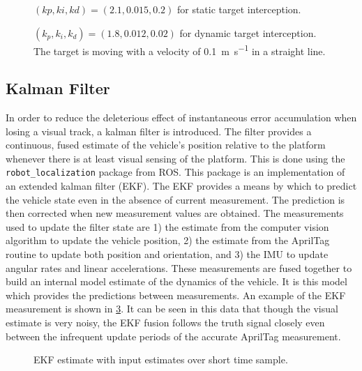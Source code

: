 \begin{figure}
    \centering
    
    \caption{$(kp,ki,kd)=(2.1,0.015,0.2)$ for static target interception.}\label{f:pid_stat}
\end{figure}

\begin{figure}
    \centering
    
    \caption{$(k_p,k_i,k_d)=(1.8,0.012,0.02)$ for dynamic target interception. The target is moving with a
    velocity of \SI{0.1}{\meter\per\s} in a straight line.}\label{f:pid_dyn}
\end{figure}


\subsection{Kalman Filter}\label{s:ekf}
In order to reduce the deleterious effect of instantaneous error accumulation when losing a visual track, a
kalman filter is introduced.  The filter provides a continuous, fused estimate of the vehicle's position
relative to the platform whenever there is at least visual sensing of the platform. This is done using the
\verb|robot_localization| package from ROS\cite{MooreStouchKeneralizedEkf2014}. This package is an
implementation of an extended kalman filter (EKF). The EKF provides a means by which to predict the vehicle
state even in the absence of current measurement\cite{kalman1960new}. The prediction is then corrected when
new measurement values are obtained. The measurements used to update the filter state are 1) the estimate from
the computer vision algorithm to update the vehicle position, 2) the estimate from the
AprilTag\cite{olson2011tags} routine to update both position and orientation, and 3) the IMU to
update angular rates and linear accelerations. These measurements are fused together to build an internal
model estimate of the dynamics of the vehicle. It is this model which provides the predictions between
measurements. An example of the EKF measurement is shown in \cref{f:ekf_plot}. It can be seen in this data
that though the visual estimate is very noisy, the EKF fusion follows the truth signal closely even between
the infrequent update periods of the accurate AprilTag measurement.

\begin{figure}[ht]
    \centering
    
    \caption{EKF estimate with input estimates over short time sample.}\label{f:ekf_plot}
\end{figure}


